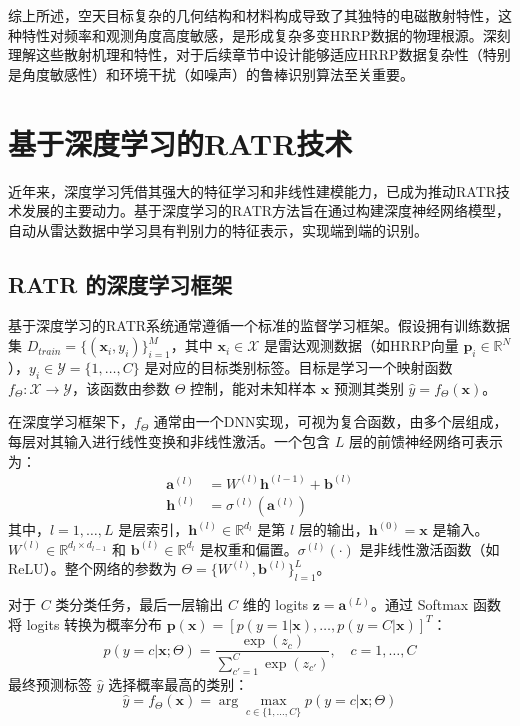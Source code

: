 综上所述，空天目标复杂的几何结构和材料构成导致了其独特的电磁散射特性，这种特性对频率和观测角度高度敏感，是形成复杂多变HRRP数据的物理根源。深刻理解这些散射机理和特性，对于后续章节中设计能够适应HRRP数据复杂性（特别是角度敏感性）和环境干扰（如噪声）的鲁棒识别算法至关重要。

\section{基于深度学习的RATR技术}
\label{sec:深度学习_ratr}

近年来，深度学习凭借其强大的特征学习和非线性建模能力，已成为推动RATR技术发展的主要动力。基于深度学习的RATR方法旨在通过构建深度神经网络模型，自动从雷达数据中学习具有判别力的特征表示，实现端到端的识别。

\subsection{RATR 的深度学习框架}
\label{subsec:深度学习_framework}

基于深度学习的RATR系统通常遵循一个标准的监督学习框架。假设拥有训练数据集 $D_{train} = \{(\mathbf{x}_i, y_i)\}_{i=1}^{M}$，其中 $\mathbf{x}_i \in \mathcal{X}$ 是雷达观测数据（如HRRP向量 $\mathbf{p}_i \in \mathbb{R}^N$），$y_i \in \mathcal{Y} = \{1, \dots, C\}$ 是对应的目标类别标签。目标是学习一个映射函数 $f_\Theta: \mathcal{X} \rightarrow \mathcal{Y}$，该函数由参数 $\Theta$ 控制，能对未知样本 $\mathbf{x}$ 预测其类别 $\hat{y} = f_\Theta(\mathbf{x})$。

在深度学习框架下，$f_\Theta$ 通常由一个DNN实现，可视为复合函数，由多个层组成，每层对其输入进行线性变换和非线性激活。一个包含 $L$ 层的前馈神经网络可表示为：
\begin{align}
    \mathbf{a}^{(l)} &= W^{(l)} \mathbf{h}^{(l-1)} + \mathbf{b}^{(l)} \label{eq:dnn_linear} \\
    \mathbf{h}^{(l)} &= \sigma^{(l)}(\mathbf{a}^{(l)}) \label{eq:dnn_activation}
\end{align}
其中，$l=1, \dots, L$ 是层索引，$\mathbf{h}^{(l)} \in \mathbb{R}^{d_l}$ 是第 $l$ 层的输出，$\mathbf{h}^{(0)} = \mathbf{x}$ 是输入。$W^{(l)} \in \mathbb{R}^{d_l \times d_{l-1}}$ 和 $\mathbf{b}^{(l)} \in \mathbb{R}^{d_l}$ 是权重和偏置。$\sigma^{(l)}(\cdot)$ 是非线性激活函数（如ReLU）。整个网络的参数为 $\Theta = \{W^{(l)}, \mathbf{b}^{(l)}\}_{l=1}^{L}$。

对于 $C$ 类分类任务，最后一层输出 $C$ 维的 logits $\mathbf{z} = \mathbf{a}^{(L)}$。通过 Softmax 函数将 logits 转换为概率分布 $\mathbf{p}(\mathbf{x}) = [p(y=1|\mathbf{x}), \dots, p(y=C|\mathbf{x})]^T$：
\begin{equation}
    p(y=c|\mathbf{x}; \Theta) = \frac{\exp(z_c)}{\sum_{c'=1}^{C} \exp(z_{c'})}, \quad c=1, \dots, C
    \label{eq:softmax}
\end{equation}
最终预测标签 $\hat{y}$ 选择概率最高的类别：
\begin{equation}
    \hat{y} = f_\Theta(\mathbf{x}) = \arg\max_{c \in \{1, \dots, C\}} p(y=c|\mathbf{x}; \Theta)
    \label{eq:prediction}
\end{equation}

